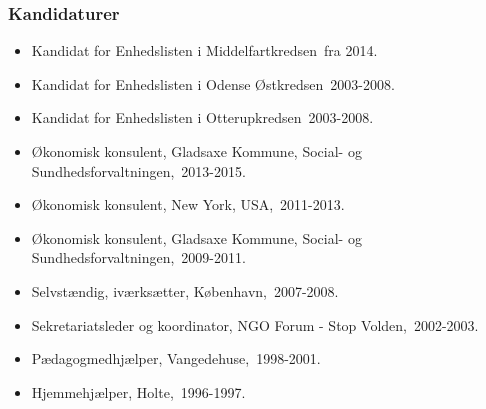\documentclass[11pt, a4paper]{awesome-cv}
\begin{document}
\begin{cvletter}
\subsubsection*{Kandidaturer}
\begin{itemize}
\item Kandidat for Enhedslisten i Middelfartkredsen fra 2014.
\item Kandidat for Enhedslisten i Odense Østkredsen 2003-2008.
\item Kandidat for Enhedslisten i Otterupkredsen 2003-2008.
\end{itemize}
\begin{itemize}
\item Økonomisk konsulent, Gladsaxe Kommune, Social- og Sundhedsforvaltningen, 2013-2015.
\item Økonomisk konsulent, New York, USA, 2011-2013.
\item Økonomisk konsulent, Gladsaxe Kommune, Social- og Sundhedsforvaltningen, 2009-2011.
\item Selvstændig, iværksætter, København, 2007-2008.
\item Sekretariatsleder og koordinator, NGO Forum - Stop Volden, 2002-2003.
\item Pædagogmedhjælper, Vangedehuse, 1998-2001.
\item Hjemmehjælper, Holte, 1996-1997.
\end{itemize}
\end{cvletter}
\end{document}
